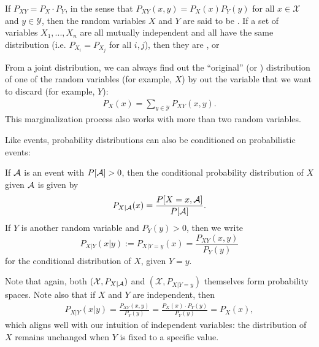 If $P_{XY} = P_X \cdot P_Y$, in the sense that $P_{XY}(x,y) = P_X(x)P_Y(y)$ for all $x \in \mathcal{X}$ and $y 
\in \mathcal{Y}$, then the random variables $X$ and $Y$ are said to be . If a set of variables $X_1, ..., X_n$ are all mutually independent and all have the same distribution (i.e. $P_{X_i} = P_{X_j}$ for all $i,j$), then they are , or 

From a joint distribution, we can always find out the ``original'' (or ) distribution of one of the random variables (for example, $X$) by  out the variable that we want to discard (for example, $Y$):
\begin{align}
P_X(x) = \sum_{y \in \mathcal{Y}} P_{XY}(x,y).
\end{align}
This marginalization process also works with more than two random variables.

Like events, probability distributions can also be conditioned on
probabilistic events:
\begin{definition}
If $\mathcal{A}$ is an event with $P[\mathcal{A}] > 0$, then the conditional probability distribution of $X$ given $\mathcal{A}$ is given by
\[
P_{X|\mathcal{A}}(x) = \frac{P[X=x, \mathcal{A}]}{P[\mathcal{A}]}.
\]
If $Y$ is another random variable and $P_Y(y) > 0$, then we write
\[
P_{X | Y}(x| y) := P_{X | Y = y}(x) = \frac{P_{XY}(x,y)}{P_Y(y)}
\]
for the conditional distribution of $X$, given $Y = y$.
\end{definition}
Note that again, both $(\mathcal{X},P_{X | \mathcal{A}})$ and $(\mathcal{X},P_{X| Y=y})$ themselves form probability spaces. Note also that if $X$ and $Y$ are independent, then
\begin{align}
P_{X | Y}(x |y) = \frac{P_{XY}(x,y)}{P_Y(y)} = \frac{P_X(x) \cdot P_Y(y)}{P_Y(y)} = P_X(x),
\end{align}
which aligns well with our intuition of independent variables: the distribution of $X$ remains unchanged when $Y$ is fixed to a specific value.

